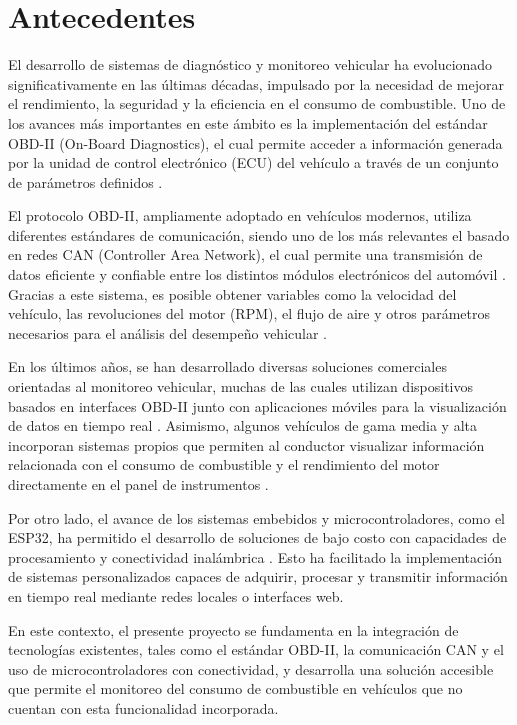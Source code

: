 \section{Antecedentes}

El desarrollo de sistemas de diagnóstico y monitoreo vehicular ha evolucionado significativamente en las últimas décadas, impulsado por la necesidad de mejorar el rendimiento, la seguridad y la eficiencia en el consumo de combustible. Uno de los avances más importantes en este ámbito es la implementación del estándar OBD-II (On-Board Diagnostics), el cual permite acceder a información generada por la unidad de control electrónico (ECU) del vehículo a través de un conjunto de parámetros definidos \citep{mccord2011automotive}.

El protocolo OBD-II, ampliamente adoptado en vehículos modernos, utiliza diferentes estándares de comunicación, siendo uno de los más relevantes el basado en redes CAN (Controller Area Network), el cual permite una transmisión de datos eficiente y confiable entre los distintos módulos electrónicos del automóvil \citep{kaschel2005analisis}. Gracias a este sistema, es posible obtener variables como la velocidad del vehículo, las revoluciones del motor (RPM), el flujo de aire y otros parámetros necesarios para el análisis del desempeño vehicular \citep{uvarov2021driver} \citep{mccord2011automotive}.

En los últimos años, se han desarrollado diversas soluciones comerciales orientadas al monitoreo vehicular, muchas de las cuales utilizan dispositivos basados en interfaces OBD-II junto con aplicaciones móviles para la visualización de datos en tiempo real \citep{machado2021analise}. Asimismo, algunos vehículos de gama media y alta incorporan sistemas propios que permiten al conductor visualizar información relacionada con el consumo de combustible y el rendimiento del motor directamente en el panel de instrumentos .

Por otro lado, el avance de los sistemas embebidos y microcontroladores, como el ESP32, ha permitido el desarrollo de soluciones de bajo costo con capacidades de procesamiento y conectividad inalámbrica \citep{putra2025real}. Esto ha facilitado la implementación de sistemas personalizados capaces de adquirir, procesar y transmitir información en tiempo real mediante redes locales o interfaces web.

En este contexto, el presente proyecto se fundamenta en la integración de tecnologías existentes, tales como el estándar OBD-II, la comunicación CAN y el uso de microcontroladores con conectividad, y desarrolla una solución accesible que permite el monitoreo del consumo de combustible en vehículos que no cuentan con esta funcionalidad incorporada.

